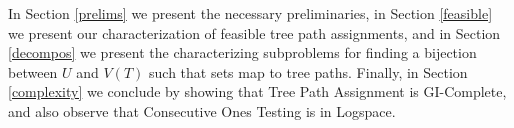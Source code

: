 \documentclass[MS]             %
              {iitmdiss_as}    %
\begin{document}
In Section \ref{prelims} we present the
necessary preliminaries, in Section \ref{feasible} we present our
characterization of feasible tree path assignments, and in Section
\ref{decompos} we present the characterizing subproblems for finding a
bijection between $U$ and $V(T)$ such that sets map to tree
paths. Finally, in Section \ref{complexity} we conclude by showing
that Tree Path Assignment is GI-Complete, and also observe that
Consecutive Ones Testing is in Logspace.



\end{document}
